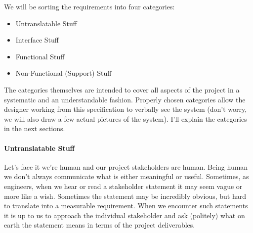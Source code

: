 \begin{slshape}
\begin{minipage}{\textwidth}
	We will be sorting the requirements into four categories:
	\begin{itemize}
		\item Untranslatable Stuff
		\item Interface Stuff
		\item Functional Stuff
		\item Non-Functional (Support) Stuff
	\end{itemize}
\end{minipage}

\bigskip

%
%

The categories themselves are intended to cover all aspects of the project in a systematic and an understandable fashion.  Properly chosen categories allow the designer working from this specification to verbally see the system (don't worry, we will also draw a few actual pictures of the system).  I'll explain the categories in the next sections.

\paragraph*{Untranslatable Stuff}

Let's face it we're human and our project stakeholders are human.  Being human we don't always communicate what is either meaningful or useful.  Sometimes, as engineers, when we hear or read a stakeholder statement it may seem vague or more like a wish.  Sometimes the statement may be incredibly obvious, but hard to translate into a measurable requirement.  When we encounter such statements it is up to us to approach the individual stakeholder and ask (politely) what on earth the statement means in terms of the project deliverables.
\bigskip  


\end{slshape}
